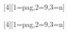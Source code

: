 [4][1=pag,2=9,3=n]{{\color{AzulLT}\fontsize{#2}{1}\selectfont{#4}}}

[4][1=pag,2=9,3=n]{{\color{AzulLT}\fontsize{#2}{1}\selectfont{#4}}}

\newcommand{\fhv}[2]{{\fontfamily{pag}\fontsize{#1}{1}\selectfont{#2}}}

\newcommand{\fhvb}[2]{{\fontfamily{pag}\fontseries{b}\fontsize{#1}{1}\selectfont{#2}}}









